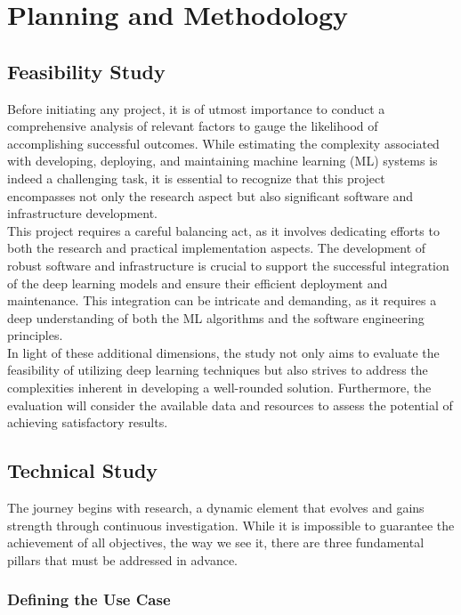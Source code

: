 \chapter{Planning and Methodology}
\label{cap:plan}

\section{Feasibility Study}

Before initiating any project, it is of utmost importance to conduct a
comprehensive analysis of relevant factors to gauge the likelihood of
accomplishing successful outcomes. While estimating the complexity associated
with developing, deploying, and maintaining machine learning (ML) systems is
indeed a challenging task, it is essential to recognize that this project
encompasses not only the research aspect but also significant software and
infrastructure development. \\

This project requires a careful balancing act, as it involves dedicating
efforts to both the research and practical implementation aspects. The
development of robust software and infrastructure is crucial to support the
successful integration of the deep learning models and ensure their efficient
deployment and maintenance. This integration can be intricate and demanding, as
it requires a deep understanding of both the ML algorithms and the software
engineering principles. \\

In light of these additional dimensions, the study not only aims to evaluate
the feasibility of utilizing deep learning techniques but also strives to
address the complexities inherent in developing a well-rounded solution.
Furthermore, the evaluation will consider the available data and resources to
assess the potential of achieving satisfactory results.

\section{Technical Study}

The journey begins with research, a dynamic element that evolves and gains
strength through continuous investigation. While it is impossible to guarantee
the achievement of all objectives, the way we see it, there are three
fundamental pillars that must be addressed in advance. \\

\subsection{Defining the Use Case}

